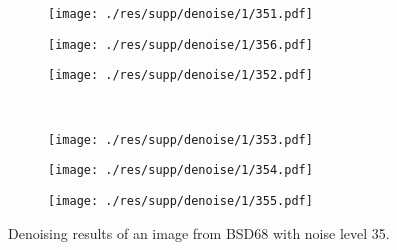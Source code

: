 \documentclass{article} %
\begin{document}
\begin{figure}[htp!]
	\centering
	\begin{subfigure}[t]{0.25\textwidth}
		\centering
		\texttt{[image: ./res/supp/denoise/1/351.pdf]}
	\end{subfigure}
	\quad
	\begin{subfigure}[t]{0.25\textwidth}
		\centering
		\texttt{[image: ./res/supp/denoise/1/356.pdf]}
	\end{subfigure}
	\quad
	\begin{subfigure}[t]{0.25\textwidth}
		\centering
		\texttt{[image: ./res/supp/denoise/1/352.pdf]}
	\end{subfigure}\\
	\begin{subfigure}[t]{0.25\textwidth}
		\centering
		\texttt{[image: ./res/supp/denoise/1/353.pdf]}
	\end{subfigure}
	\quad
	\begin{subfigure}[t]{0.25\textwidth}
		\centering
		\texttt{[image: ./res/supp/denoise/1/354.pdf]}
	\end{subfigure}
	\quad
	\begin{subfigure}[t]{0.25\textwidth}
		\centering
		\texttt{[image: ./res/supp/denoise/1/355.pdf]}
	\end{subfigure}
	\caption{Denoising results of an image from BSD68 with
		noise level 35.}
	\label{dn1}
\end{figure}
\end{document}
